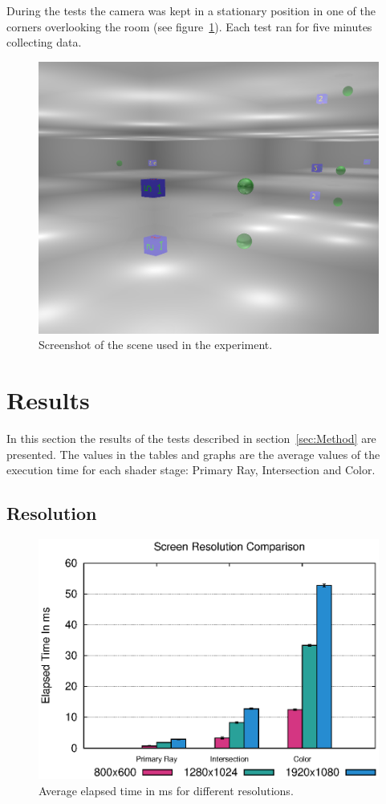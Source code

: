 \documentclass{article}
\begin{document}
During the tests the camera was kept in a stationary position in one of the corners overlooking the room (see figure~\ref{fig:screenshot_01}).
Each test ran for five minutes collecting data.

\begin{figure}[h!tbp]
    \centering
    \includegraphics[width=0.9\columnwidth]{Figures/screenshot_01.png}
    \caption{Screenshot of the scene used in the experiment. \label{fig:screenshot_01}}
\end{figure}



\section{Results}
\label{sec:Results}
In this section the results of the tests described in section~\ref{sec:Method} are presented. The values in the tables and
graphs are the average values of the execution time for each shader stage: Primary Ray, Intersection and Color.


\subsection{Resolution}

\begin{figure}[h!tbp]
\centering
\includegraphics[width=1.0\columnwidth]{Figures/resolution.eps}
\caption{Average elapsed time in ms for different resolutions. \label{fig:resolution}}
\end{figure}
\end{document}

